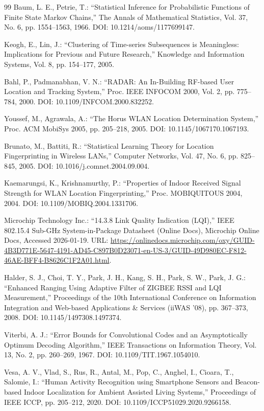 \documentclass[a4paper,12pt]{jreport}
\begin{document}
\begin{thebibliography}{99}
Baum, L. E., Petrie, T.: ``Statistical Inference for Probabilistic Functions of Finite State Markov Chains,''
The Annals of Mathematical Statistics, Vol. 37, No. 6, pp. 1554--1563, 1966.
DOI: 10.1214/aoms/1177699147.

Keogh, E., Lin, J.: ``Clustering of Time-series Subsequences is Meaningless: Implications for Previous and Future Research,''
Knowledge and Information Systems, Vol. 8, pp. 154--177, 2005.

Bahl, P., Padmanabhan, V. N.: ``RADAR: An In-Building RF-based User Location and Tracking System,''
Proc. IEEE INFOCOM 2000, Vol. 2, pp. 775--784, 2000.
DOI: 10.1109/INFCOM.2000.832252.

Youssef, M., Agrawala, A.: ``The Horus WLAN Location Determination System,''
Proc. ACM MobiSys 2005, pp. 205--218, 2005.
DOI: 10.1145/1067170.1067193.

Brunato, M., Battiti, R.: ``Statistical Learning Theory for Location Fingerprinting in Wireless LANs,''
Computer Networks, Vol. 47, No. 6, pp. 825--845, 2005.
DOI: 10.1016/j.comnet.2004.09.004.

Kaemarungsi, K., Krishnamurthy, P.: ``Properties of Indoor Received Signal Strength for WLAN Location Fingerprinting,''
Proc. MOBIQUITOUS 2004, 2004.
DOI: 10.1109/MOBIQ.2004.1331706.

Microchip Technology Inc.: ``14.3.8 Link Quality Indication (LQI),''
IEEE 802.15.4 Sub-GHz System-in-Package Datasheet (Online Docs),
Microchip Online Docs, Accessed 2026-01-19.
URL: \url{https://onlinedocs.microchip.com/oxy/GUID-4B3D771E-5647-4191-AD45-C897B0D23071-en-US-3/GUID-49D980EC-F812-46AE-BFF4-B8626C1F2A01.html}.

Halder, S. J., Choi, T. Y., Park, J. H., Kang, S. H., Park, S. W., Park, J. G.:
``Enhanced Ranging Using Adaptive Filter of ZIGBEE RSSI and LQI Measurement,''
Proceedings of the 10th International Conference on Information Integration and Web-based Applications \& Services (iiWAS '08),
pp. 367--373, 2008.
DOI: 10.1145/1497308.1497374.

Viterbi, A. J.: ``Error Bounds for Convolutional Codes and an Asymptotically Optimum Decoding Algorithm,''
IEEE Transactions on Information Theory, Vol. 13, No. 2, pp. 260--269, 1967.
DOI: 10.1109/TIT.1967.1054010.

Vesa, A. V., Vlad, S., Rus, R., Antal, M., Pop, C., Anghel, I., Cioara, T., Salomie, I.:
``Human Activity Recognition using Smartphone Sensors and Beacon-based Indoor Localization for Ambient Assisted Living Systems,''
Proceedings of IEEE ICCP, pp. 205--212, 2020.
DOI: 10.1109/ICCP51029.2020.9266158.


\end{thebibliography}
\end{document}
